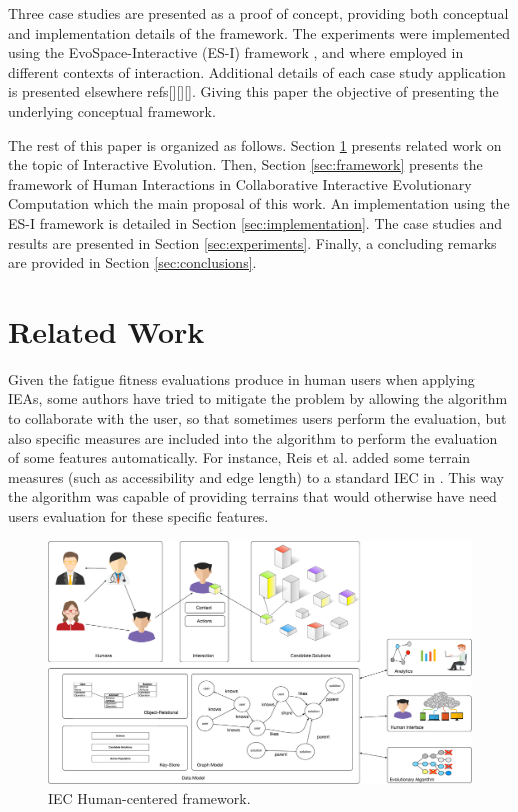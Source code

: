 Three case studies are presented as a proof of concept, providing both
conceptual and implementation details of the framework. 
The experiments were implemented using the EvoSpace-Interactive (ES-I) framework \cite{garcia2013evospace}, 
and where employed in different contexts of interaction. 
Additional details of each case study application is presented elsewhere refs[][][]. 
Giving this paper the objective of presenting the underlying conceptual framework.     

The rest of this paper is organized as follows.
Section \ref{sec:related} presents related work on the topic 
of Interactive Evolution.
Then, Section \ref{sec:framework} presents the framework of Human Interactions in Collaborative Interactive 
 Evolutionary Computation which 
the main proposal of this work. An implementation using the ES-I framework is detailed in Section \ref{sec:implementation}.
The case studies  and results are presented in Section \ref{sec:experiments}.
Finally, a concluding remarks are provided in Section \ref{sec:conclusions}.

\section{Related Work}
\label{sec:related}
Given the fatigue fitness evaluations produce in human users when applying IEAs, some authors have tried to mitigate
the problem by allowing the algorithm to collaborate with the user, so that sometimes users perform the evaluation, 
but also specific measures are included into the algorithm to perform the evaluation of some features automatically.  
For instance, Reis et al. added some terrain measures (such as accessibility and edge length) to a standard 
IEC in \cite{DBLP:journals/soco/FradeVC12} .  This way the algorithm was capable of providing terrains that would
otherwise have need users evaluation for these specific features.


\begin{figure}[!t]
    \centering
        \includegraphics[width=5in]{img/framework.eps}
    \caption{IEC Human-centered framework.}
    \label{fig:hc_framework}
\end{figure}

